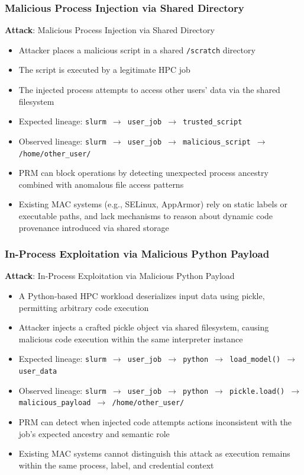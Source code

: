 \documentclass[conference]{IEEEtran}
\begin{document}
\subsubsection{Malicious Process Injection via Shared Directory}
\textbf{Attack}: Malicious Process Injection via Shared Directory
\begin{itemize}
\item Attacker places a malicious script in a shared \texttt{/scratch} directory
\item The script is executed by a legitimate HPC job
\item The injected process attempts to access other users' data via the shared filesystem
\item Expected lineage: \texttt{slurm $\rightarrow$ user\_job $\rightarrow$ trusted\_script}
\item Observed lineage: \texttt{slurm $\rightarrow$ user\_job $\rightarrow$ malicious\_script $\rightarrow$ /home/other\_user/}
\item PRM can block operations by detecting unexpected process ancestry combined with anomalous file access patterns
\item Existing MAC systems (e.g., SELinux, AppArmor) rely on static labels or executable paths, and lack mechanisms to reason about dynamic code provenance introduced via shared storage
\end{itemize}

\subsubsection{In-Process Exploitation via Malicious Python Payload}
\textbf{Attack}: In-Process Exploitation via Malicious Python Payload
\begin{itemize}
\item A Python-based HPC workload deserializes input data using pickle, permitting arbitrary code execution
\item Attacker injects a crafted pickle object via shared filesystem, causing malicious code execution within the same interpreter instance
\item Expected lineage: \texttt{slurm $\rightarrow$ user\_job $\rightarrow$ python $\rightarrow$ load\_model() $\rightarrow$ user\_data}
\item Observed lineage: \texttt{slurm $\rightarrow$ user\_job $\rightarrow$ python $\rightarrow$ pickle.load() $\rightarrow$ malicious\_payload $\rightarrow$ /home/other\_user/}
\item PRM can detect when injected code attempts actions inconsistent with the job's expected ancestry and semantic role
\item Existing MAC systems cannot distinguish this attack as execution remains within the same process, label, and credential context
\end{itemize}
\end{document}
